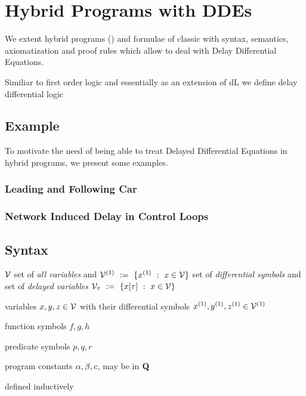 \chapter{Hybrid Programs with DDEs}\label{hybrid-programs-with-ddes}

We extent hybrid programs (\HPs) and formulae of classic \dL with syntax, semantics, axiomatization and proof rules which allow to deal with Delay Differential Equations.

Similiar to first order logic and essentially as an extension of dL we define delay differential logic

\section{Example}
    \label{example-hp-cars}
    To motivate the need of being able to treat Delayed Differential Equations in hybrid programs, we present some examples.

    \subsection{Leading and Following Car}

    \subsection{Network Induced Delay in Control Loops}

\section{Syntax}
    \label{sec:syntax}

    $\mathcal{V}$ set of \textit{all variables} and $\diffvars\defeq\{\D{x} \with x\in\allvars\}$ set of \textit{differential symbols} and set of \textit{delayed variables} $\mathcal{V}_\tau~\mathrel{\mathop{:}}=~\{x[\tau] ~\mathrel{\mathop{:}}~ x\in\mathcal{V}\}$

    variables $x,y,z\in\mathcal{V}$ with their differential symbols $\D{x},\D{y},\D{z}\in\D{\allvars}$

    function symbols $f,g,h$

    predicate symbols $p,q,r$

    program constants $\alpha, \beta, c$, may be in $\mathbf{Q}$

    defined inductively

